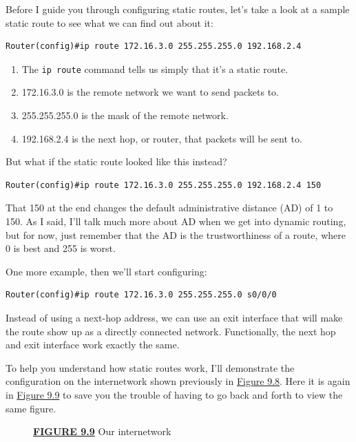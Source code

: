 Before I guide you through configuring static routes, let's take a look
at a sample static route to see what we can find out about it:

\begin{verbatim}
Router(config)#ip route 172.16.3.0 255.255.255.0 192.168.2.4
\end{verbatim}

\begin{enumerate}
\tightlist
\item
  The \texttt{ip\ route} command tells us simply that it's a static
  route.
\item
  172.16.3.0 is the remote network we want to send packets to.
\item
  255.255.255.0 is the mask of the remote network.
\item
  192.168.2.4 is the next hop, or router, that packets will be sent to.
\end{enumerate}

But what if the static route looked like this instead?

\begin{verbatim}
Router(config)#ip route 172.16.3.0 255.255.255.0 192.168.2.4 150
\end{verbatim}

That 150 at the end changes the default administrative distance (AD) of
1 to 150. As I said, I'll talk much more about AD when we get into
dynamic routing, but for now, just remember that the AD is the
trustworthiness of a route, where 0 is best and 255 is worst.

\protect\hypertarget{c09.xhtmlux5cux23Page_384}{}{}One more example,
then we'll start configuring:

\begin{verbatim}
Router(config)#ip route 172.16.3.0 255.255.255.0 s0/0/0
\end{verbatim}

Instead of using a next-hop address, we can use an exit interface that
will make the route show up as a directly connected network.
Functionally, the next hop and exit interface work exactly the same.

To help you understand how static routes work, I'll demonstrate the
configuration on the internetwork shown previously in
\protect\hyperlink{c09.xhtmlux5cux23figure9-8}{Figure 9.8}. Here it is
again in \protect\hyperlink{c09.xhtmlux5cux23figure9-9}{Figure 9.9} to
save you the trouble of having to go back and forth to view the same
figure.

\begin{figure}
\centering
\caption{{\protect\hyperlink{c09.xhtmlux5cux23figureanchor9-9}{\textbf{FIGURE
9.9}} Our internetwork}}
\end{figure}


